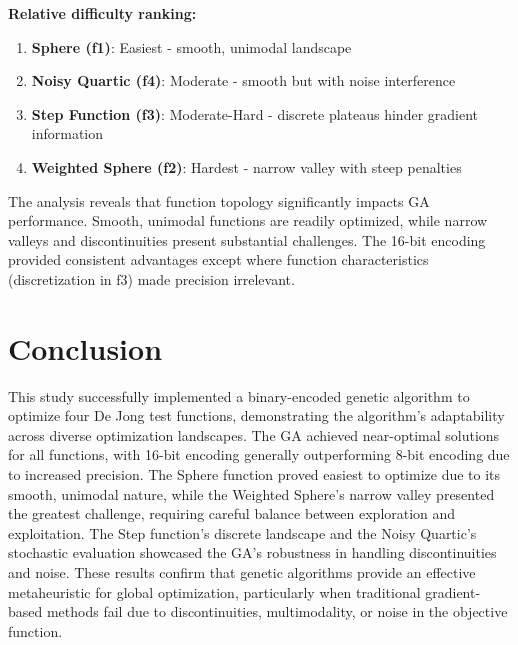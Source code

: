 \documentclass[journal,12pt,onecolumn]{IEEEtran}
\begin{document}
\textbf{Relative difficulty ranking:}
\begin{enumerate}
    \item \textbf{Sphere (f1)}: Easiest - smooth, unimodal landscape
    \item \textbf{Noisy Quartic (f4)}: Moderate - smooth but with noise interference
    \item \textbf{Step Function (f3)}: Moderate-Hard - discrete plateaus hinder gradient information
    \item \textbf{Weighted Sphere (f2)}: Hardest - narrow valley with steep penalties
\end{enumerate}

The analysis reveals that function topology significantly impacts GA performance. Smooth, unimodal functions are readily optimized, while narrow valleys and discontinuities present substantial challenges. The 16-bit encoding provided consistent advantages except where function characteristics (discretization in f3) made precision irrelevant.

\section{Conclusion}
This study successfully implemented a binary-encoded genetic algorithm to optimize four De Jong test functions, demonstrating the algorithm's adaptability across diverse optimization landscapes. The GA achieved near-optimal solutions for all functions, with 16-bit encoding generally outperforming 8-bit encoding due to increased precision. The Sphere function proved easiest to optimize due to its smooth, unimodal nature, while the Weighted Sphere's narrow valley presented the greatest challenge, requiring careful balance between exploration and exploitation. The Step function's discrete landscape and the Noisy Quartic's stochastic evaluation showcased the GA's robustness in handling discontinuities and noise. These results confirm that genetic algorithms provide an effective metaheuristic for global optimization, particularly when traditional gradient-based methods fail due to discontinuities, multimodality, or noise in the objective function.
\end{document}
